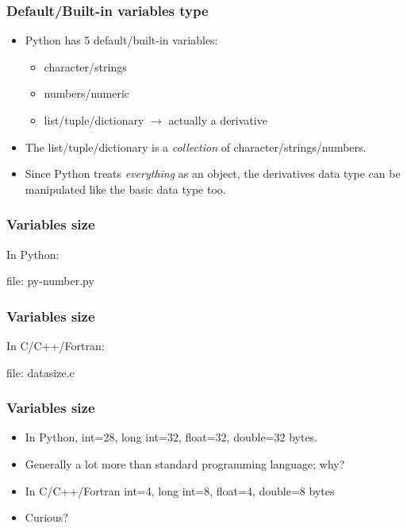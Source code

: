 \begin{frame}[fragile]
\frametitle{Default/Built-in variables type}

\begin{itemize}
\item Python has 5 default/built-in variables:
	\begin{itemize}
	\item character/strings
	\item numbers/numeric
	\item list/tuple/dictionary $\longrightarrow$ actually a derivative
	\end{itemize}

\item The list/tuple/dictionary is a \emph{collection} of character/strings/numbers.
\item Since Python treats \emph{everything} as an object, the derivatives data type can be manipulated like the basic data type too.
\end{itemize}

\end{frame}


\begin{frame}[fragile]
\frametitle{Variables size}
In Python:
\newcommand{\newfilename}{py-number.py}



file: \newfilename
\end{frame}

\begin{frame}[fragile]
\frametitle{Variables size}
In C/C++/Fortran:
\newcommand{\newfilename}{datasize.c}



file: \newfilename
\end{frame}

\begin{frame}[fragile]
\frametitle{Variables size}
\begin{itemize}
\item In Python, int=28, long int=32, float=32, double=32 bytes.
\item Generally a lot more than standard programming language; why?
\item In C/C++/Fortran int=4, long int=8, float=4, double=8 bytes
\item Curious?
\end{itemize}

\end{frame}